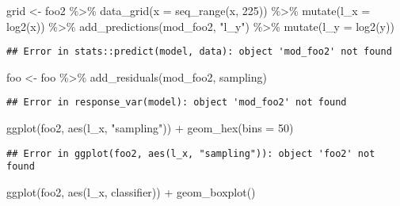 \documentclass[
]{article}
\newenvironment{Shaded}{\begin{snugshade}}{\end{snugshade}}
\newcommand{\AttributeTok}[1]{\textcolor[rgb]{0.77,0.63,0.00}{#1}}
\newcommand{\DecValTok}[1]{\textcolor[rgb]{0.00,0.00,0.81}{#1}}
\newcommand{\FunctionTok}[1]{\textcolor[rgb]{0.00,0.00,0.00}{#1}}
\newcommand{\NormalTok}[1]{#1}
\newcommand{\OtherTok}[1]{\textcolor[rgb]{0.56,0.35,0.01}{#1}}
\newcommand{\SpecialCharTok}[1]{\textcolor[rgb]{0.00,0.00,0.00}{#1}}
\newcommand{\StringTok}[1]{\textcolor[rgb]{0.31,0.60,0.02}{#1}}
\begin{document}
\begin{Shaded}
\begin{Highlighting}[]
\NormalTok{grid }\OtherTok{\textless{}{-}}\NormalTok{ foo2 }\SpecialCharTok{\%\textgreater{}\%}
  \FunctionTok{data\_grid}\NormalTok{(}\AttributeTok{x =} \FunctionTok{seq\_range}\NormalTok{(x, }\DecValTok{225}\NormalTok{)) }\SpecialCharTok{\%\textgreater{}\%}
  \FunctionTok{mutate}\NormalTok{(}\AttributeTok{l\_x =} \FunctionTok{log2}\NormalTok{(x)) }\SpecialCharTok{\%\textgreater{}\%}
  \FunctionTok{add\_predictions}\NormalTok{(mod\_foo2, }\StringTok{"l\_y"}\NormalTok{) }\SpecialCharTok{\%\textgreater{}\%}
  \FunctionTok{mutate}\NormalTok{(}\AttributeTok{l\_y =} \FunctionTok{log2}\NormalTok{(y))}
\end{Highlighting}
\end{Shaded}

\begin{verbatim}
## Error in stats::predict(model, data): object 'mod_foo2' not found
\end{verbatim}

\begin{Shaded}
\begin{Highlighting}[]
\NormalTok{foo }\OtherTok{\textless{}{-}}\NormalTok{ foo }\SpecialCharTok{\%\textgreater{}\%} 
    \FunctionTok{add\_residuals}\NormalTok{(mod\_foo2, sampling)}
\end{Highlighting}
\end{Shaded}

\begin{verbatim}
## Error in response_var(model): object 'mod_foo2' not found
\end{verbatim}

\begin{Shaded}
\begin{Highlighting}[]
\FunctionTok{ggplot}\NormalTok{(foo2, }\FunctionTok{aes}\NormalTok{(l\_x, }\StringTok{"sampling"}\NormalTok{)) }\SpecialCharTok{+} 
  \FunctionTok{geom\_hex}\NormalTok{(}\AttributeTok{bins =} \DecValTok{50}\NormalTok{)}
\end{Highlighting}
\end{Shaded}

\begin{verbatim}
## Error in ggplot(foo2, aes(l_x, "sampling")): object 'foo2' not found
\end{verbatim}

\begin{Shaded}
\begin{Highlighting}[]
\FunctionTok{ggplot}\NormalTok{(foo2, }\FunctionTok{aes}\NormalTok{(l\_x, classifier)) }\SpecialCharTok{+} \FunctionTok{geom\_boxplot}\NormalTok{()}
\end{Highlighting}
\end{Shaded}
\end{document}
